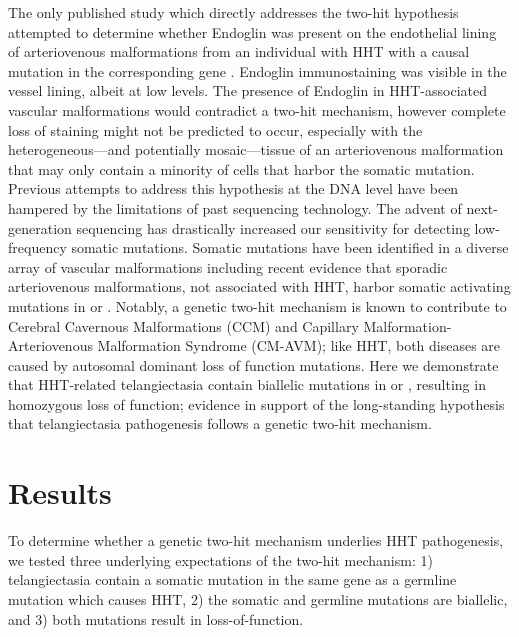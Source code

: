 The only published study which directly addresses the two-hit hypothesis attempted to determine whether Endoglin was present on the endothelial lining of arteriovenous malformations from an individual with HHT with a causal mutation in the corresponding gene .\citep{pece1999} Endoglin immunostaining was visible in the vessel lining, albeit at low levels. The presence of Endoglin in HHT-associated vascular malformations would contradict a two-hit mechanism, however complete loss of staining might not be predicted to occur, especially with the heterogeneous---and potentially mosaic---tissue of an arteriovenous malformation that may only contain a minority of cells that harbor the somatic mutation. Previous attempts to address this hypothesis at the DNA level have been hampered by the limitations of past sequencing technology. The advent of next-generation sequencing has drastically increased our sensitivity for detecting low-frequency somatic mutations. Somatic mutations have been identified in a diverse array of vascular malformations\citep{alolabi2018, soblet2017, limaye2015, limaye2009, shirley2013, couto2015, luks2015} including recent evidence that sporadic arteriovenous malformations, not associated with HHT, harbor somatic activating mutations in  or .\citep{nikolaev2018, couto2017} Notably, a genetic two-hit mechanism is known to contribute to Cerebral Cavernous Malformations (CCM)\citep{akers2009, mcdonald2014, gault2009} and Capillary Malformation-Arteriovenous Malformation Syndrome (CM-AVM)\citep{macmurdo2016}; like HHT, both diseases are caused by autosomal dominant loss of function mutations. Here we demonstrate that HHT-related telangiectasia contain biallelic mutations in  or , resulting in homozygous loss of function; evidence in support of the long-standing hypothesis that telangiectasia pathogenesis follows a genetic two-hit mechanism.


\section{Results}
To determine whether a genetic two-hit mechanism underlies HHT pathogenesis, we tested three underlying expectations of the two-hit mechanism: 1) telangiectasia contain a somatic mutation in the same gene as a germline mutation which causes HHT, 2) the somatic and germline mutations are biallelic, and 3) both mutations result in loss-of-function.

